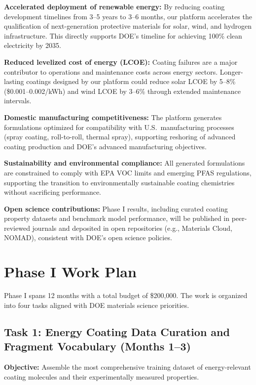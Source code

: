 \documentclass[11pt,letterpaper]{article}
\begin{document}
\textbf{Accelerated deployment of renewable energy:} By reducing coating development timelines from 3--5 years to 3--6 months, our platform accelerates the qualification of next-generation protective materials for solar, wind, and hydrogen infrastructure. This directly supports DOE's timeline for achieving 100\% clean electricity by 2035.

\textbf{Reduced levelized cost of energy (LCOE):} Coating failures are a major contributor to operations and maintenance costs across energy sectors. Longer-lasting coatings designed by our platform could reduce solar LCOE by 5--8\% (\$0.001--0.002/kWh) and wind LCOE by 3--6\% through extended maintenance intervals.

\textbf{Domestic manufacturing competitiveness:} The platform generates formulations optimized for compatibility with U.S.\ manufacturing processes (spray coating, roll-to-roll, thermal spray), supporting reshoring of advanced coating production and DOE's advanced manufacturing objectives.

\textbf{Sustainability and environmental compliance:} All generated formulations are constrained to comply with EPA VOC limits and emerging PFAS regulations, supporting the transition to environmentally sustainable coating chemistries without sacrificing performance.

\textbf{Open science contributions:} Phase I results, including curated coating property datasets and benchmark model performance, will be published in peer-reviewed journals and deposited in open repositories (e.g., Materials Cloud, NOMAD), consistent with DOE's open science policies.

\section{Phase I Work Plan}
\label{sec:workplan}

Phase I spans 12 months with a total budget of \$200,000. The work is organized into four tasks aligned with DOE materials science priorities.

\subsection{Task 1: Energy Coating Data Curation and Fragment Vocabulary (Months 1--3)}

\textbf{Objective:} Assemble the most comprehensive training dataset of energy-relevant coating molecules and their experimentally measured properties.
\end{document}
